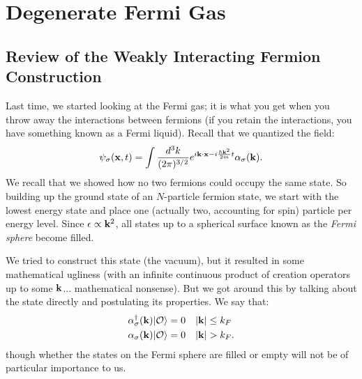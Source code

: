 \section{Degenerate Fermi Gas}
\subsection{Review of the Weakly Interacting Fermion Construction}
Last time, we started looking at the Fermi gas; it is what you get when you throw away the interactions between fermions (if you retain the interactions, you have something known as a Fermi liquid). Recall that we quantized the field:
\begin{equation}
    \psi_\sigma(\mathbf{x}, t) = \int \frac{d^3k}{(2\pi)^{3/2}}e^{i\mathbf{k} \cdot \mathbf{x} - i\frac{\hbar\mathbf{k}^2}{2m}t} \alpha_\sigma(\mathbf{k}).
\end{equation}
We recall that we showed how no two fermions could occupy the same state. So building up the ground state of an $N$-particle fermion state, we start with the lowest energy state and place one (actually two, accounting for spin) particle per energy level. Since $\epsilon \propto \mathbf{k}^2$, all states up to a spherical surface known as the \emph{Fermi sphere} become filled. 

We tried to construct this state (the vacuum), but it resulted in some mathematical ugliness (with an infinite continuous product of creation operators up to some $\mathbf{k}$... mathematical nonsense). But we got around this by talking about the state directly and postulating its properties. We say that:
\begin{equation}
    \begin{split}
        &\alpha_\sigma^{\dagger}(\mathbf{k})\lvert \mathcal{O} \rangle = 0 \quad \lvert \mathbf{k} \rvert \leq k_F
        \\ &\alpha_\sigma(\mathbf{k})\lvert \mathcal{O} \rangle = 0 \quad \lvert \mathbf{k} \rvert > k_F.
    \end{split}
\end{equation}
though whether the states on the Fermi sphere are filled or empty will not be of particular importance to us. 

